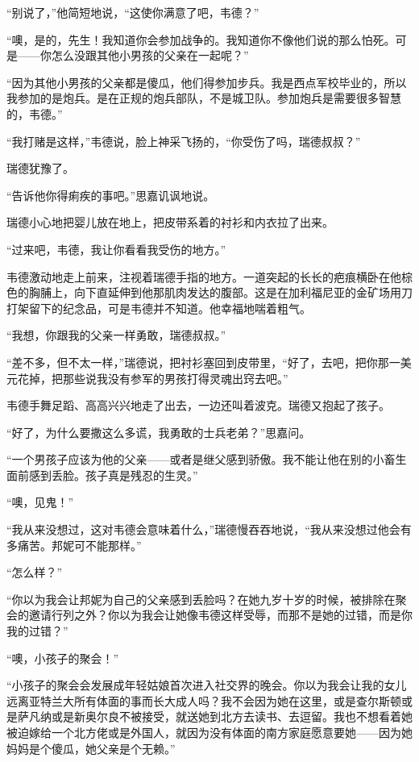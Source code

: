 \par “别说了，”他简短地说，“这使你满意了吧，韦德？”
\par “噢，是的，先生！我知道你会参加战争的。我知道你不像他们说的那么怕死。可是——你怎么没跟其他小男孩的父亲在一起呢？”
\par “因为其他小男孩的父亲都是傻瓜，他们得参加步兵。我是西点军校毕业的，所以我参加的是炮兵。是在正规的炮兵部队，不是城卫队。参加炮兵是需要很多智慧的，韦德。”
\par “我打赌是这样，”韦德说，脸上神采飞扬的，“你受伤了吗，瑞德叔叔？”
\par 瑞德犹豫了。
\par “告诉他你得痢疾的事吧。”思嘉讥讽地说。
\par 瑞德小心地把婴儿放在地上，把皮带系着的衬衫和内衣拉了出来。
\par “过来吧，韦德，我让你看看我受伤的地方。”
\par 韦德激动地走上前来，注视着瑞德手指的地方。一道突起的长长的疤痕横卧在他棕色的胸脯上，向下直延伸到他那肌肉发达的腹部。这是在加利福尼亚的金矿场用刀打架留下的纪念品，可是韦德并不知道。他幸福地喘着粗气。
\par “我想，你跟我的父亲一样勇敢，瑞德叔叔。”
\par “差不多，但不太一样，”瑞德说，把衬衫塞回到皮带里，“好了，去吧，把你那一美元花掉，把那些说我没有参军的男孩打得灵魂出窍去吧。”
\par 韦德手舞足蹈、高高兴兴地走了出去，一边还叫着波克。瑞德又抱起了孩子。
\par “好了，为什么要撒这么多谎，我勇敢的士兵老弟？”思嘉问。
\par “一个男孩子应该为他的父亲——或者是继父感到骄傲。我不能让他在别的小畜生面前感到丢脸。孩子真是残忍的生灵。”
\par “噢，见鬼！”
\par “我从来没想过，这对韦德会意味着什么，”瑞德慢吞吞地说，“我从来没想过他会有多痛苦。邦妮可不能那样。”
\par “怎么样？”
\par “你以为我会让邦妮为自己的父亲感到丢脸吗？在她九岁十岁的时候，被排除在聚会的邀请行列之外？你以为我会让她像韦德这样受辱，而那不是她的过错，而是你我的过错？”
\par “噢，小孩子的聚会！”
\par “小孩子的聚会会发展成年轻姑娘首次进入社交界的晚会。你以为我会让我的女儿远离亚特兰大所有体面的事而长大成人吗？我不会因为她在这里，或是查尔斯顿或是萨凡纳或是新奥尔良不被接受，就送她到北方去读书、去逗留。我也不想看着她被迫嫁给一个北方佬或是外国人，就因为没有体面的南方家庭愿意要她——因为她妈妈是个傻瓜，她父亲是个无赖。”
